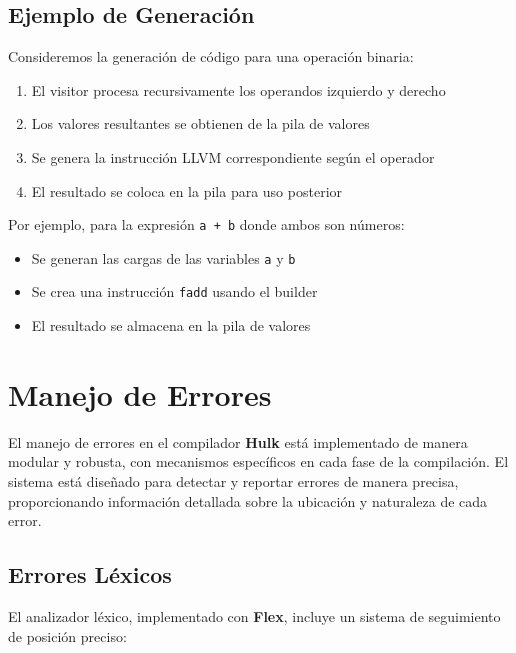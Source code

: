 \documentclass[11pt, a4paper, twoside]{article} %
\begin{document}
\subsection{Ejemplo de Generación}

Consideremos la generación de código para una operación binaria:

\begin{enumerate}
    \item El visitor procesa recursivamente los operandos izquierdo y derecho
    \item Los valores resultantes se obtienen de la pila de valores
    \item Se genera la instrucción LLVM correspondiente según el operador
    \item El resultado se coloca en la pila para uso posterior
\end{enumerate}

Por ejemplo, para la expresión \texttt{a + b} donde ambos son números:

\begin{itemize}
    \item Se generan las cargas de las variables \texttt{a} y \texttt{b}
    \item Se crea una instrucción \texttt{fadd} usando el builder
    \item El resultado se almacena en la pila de valores
\end{itemize}

\section{Manejo de Errores}

El manejo de errores en el compilador \textbf{Hulk} está implementado de manera modular y robusta, con mecanismos específicos en cada fase de la compilación. El sistema está diseñado para detectar y reportar errores de manera precisa, proporcionando información detallada sobre la ubicación y naturaleza de cada error.

\subsection{Errores Léxicos}

El analizador léxico, implementado con \textbf{Flex}, incluye un sistema de seguimiento de posición preciso:
\end{document}
